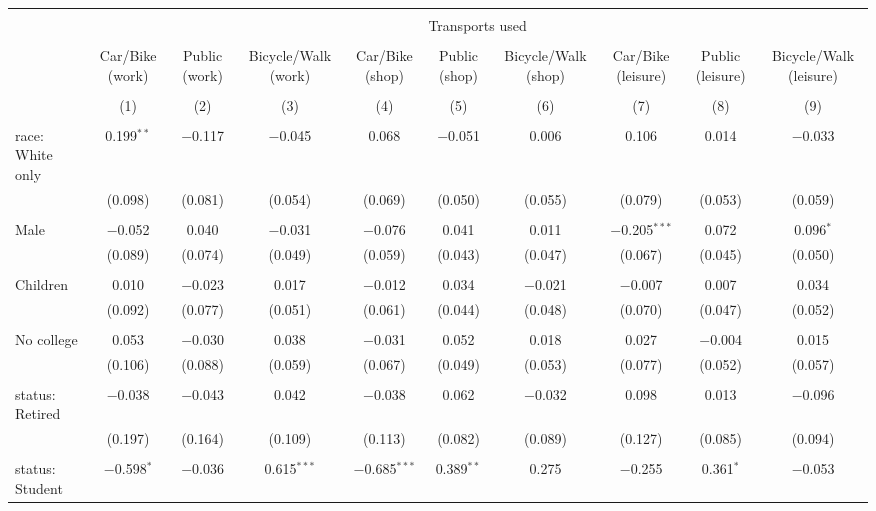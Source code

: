 
\begin{tabular}{@{\extracolsep{5pt}}lccccccccc} 
\\[-1.8ex]\hline 
\hline \\[-1.8ex] 
 & \multicolumn{9}{c}{Transports used} \\ 
\cline{2-10} 
\\[-1.8ex] & Car/Bike (work) & Public (work) & Bicycle/Walk (work) & Car/Bike (shop) & Public (shop) & Bicycle/Walk (shop) & Car/Bike (leisure) & Public (leisure) & Bicycle/Walk (leisure) \\ 
\\[-1.8ex] & (1) & (2) & (3) & (4) & (5) & (6) & (7) & (8) & (9)\\ 
\hline \\[-1.8ex] 
 race: White only & 0.199$^{**}$ & $-$0.117 & $-$0.045 & 0.068 & $-$0.051 & 0.006 & 0.106 & 0.014 & $-$0.033 \\ 
  & (0.098) & (0.081) & (0.054) & (0.069) & (0.050) & (0.055) & (0.079) & (0.053) & (0.059) \\ 
  & & & & & & & & & \\ 
 Male & $-$0.052 & 0.040 & $-$0.031 & $-$0.076 & 0.041 & 0.011 & $-$0.205$^{***}$ & 0.072 & 0.096$^{*}$ \\ 
  & (0.089) & (0.074) & (0.049) & (0.059) & (0.043) & (0.047) & (0.067) & (0.045) & (0.050) \\ 
  & & & & & & & & & \\ 
 Children & 0.010 & $-$0.023 & 0.017 & $-$0.012 & 0.034 & $-$0.021 & $-$0.007 & 0.007 & 0.034 \\ 
  & (0.092) & (0.077) & (0.051) & (0.061) & (0.044) & (0.048) & (0.070) & (0.047) & (0.052) \\ 
  & & & & & & & & & \\ 
 No college & 0.053 & $-$0.030 & 0.038 & $-$0.031 & 0.052 & 0.018 & 0.027 & $-$0.004 & 0.015 \\ 
  & (0.106) & (0.088) & (0.059) & (0.067) & (0.049) & (0.053) & (0.077) & (0.052) & (0.057) \\ 
  & & & & & & & & & \\ 
 status: Retired & $-$0.038 & $-$0.043 & 0.042 & $-$0.038 & 0.062 & $-$0.032 & 0.098 & 0.013 & $-$0.096 \\ 
  & (0.197) & (0.164) & (0.109) & (0.113) & (0.082) & (0.089) & (0.127) & (0.085) & (0.094) \\ 
  & & & & & & & & & \\ 
 status: Student & $-$0.598$^{*}$ & $-$0.036 & 0.615$^{***}$ & $-$0.685$^{***}$ & 0.389$^{**}$ & 0.275 & $-$0.255 & 0.361$^{*}$ & $-$0.053 \\ 

\end{tabular}
